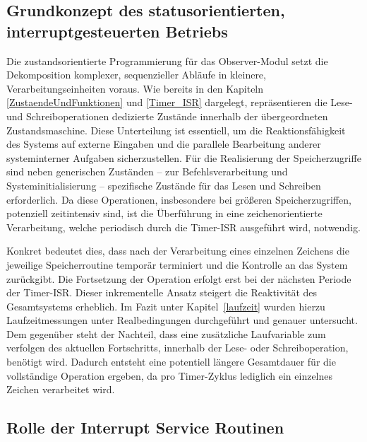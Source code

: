 
\subsection{Grundkonzept des statusorientierten, interruptgesteuerten Betriebs}
\label{konzept_status_&_interrupt}

Die zustandsorientierte Programmierung f\"ur das Observer-Modul setzt die Dekomposition komplexer, sequenzieller Abl\"aufe in kleinere, Verarbeitungseinheiten voraus. Wie bereits in den Kapiteln \ref{ZustaendeUndFunktionen} und \ref{Timer_ISR} dargelegt, repr\"asentieren die Lese- und Schreiboperationen dedizierte Zust\"ande innerhalb der \"ubergeordneten Zustandsmaschine. Diese Unterteilung ist essentiell, um die Reaktionsf\"ahigkeit des Systems auf externe Eingaben und die parallele Bearbeitung anderer systeminterner Aufgaben sicherzustellen. F\"ur die Realisierung der Speicherzugriffe sind neben generischen Zust\"anden -- zur Befehlsverarbeitung und Systeminitialisierung -- spezifische Zust\"ande f\"ur das Lesen und Schreiben erforderlich. Da diese Operationen, insbesondere bei gr\"o{\ss}eren Speicherzugriffen, potenziell zeitintensiv sind, ist die \"Uberf\"uhrung in eine zeichenorientierte Verarbeitung, welche periodisch durch die Timer-ISR ausgef\"uhrt wird, notwendig.

Konkret bedeutet dies, dass nach der Verarbeitung eines einzelnen Zeichens die jeweilige Speicherroutine tempor\"ar terminiert und die Kontrolle an das System zur\"uckgibt. Die Fortsetzung der Operation erfolgt erst bei der n\"achsten Periode der Timer-ISR. Dieser inkrementelle Ansatz steigert die Reaktivit\"at des Gesamtsystems erheblich. Im Fazit unter Kapitel~\ref{laufzeit} wurden hierzu Laufzeitmessungen unter Realbedingungen durchgef\"uhrt und genauer untersucht. Dem gegen\"uber steht der Nachteil, dass eine zus\"atzliche Laufvariable zum verfolgen des aktuellen Fortschritts, innerhalb der Lese- oder Schreiboperation, ben\"otigt wird. Dadurch entsteht eine potentiell l\"angere Gesamtdauer f\"ur die vollst\"andige Operation ergeben, da pro Timer-Zyklus lediglich ein einzelnes Zeichen verarbeitet wird.\AI


\subsection{Rolle der Interrupt Service Routinen}
\label{LesenSchreiben_Rolle_ISR}

